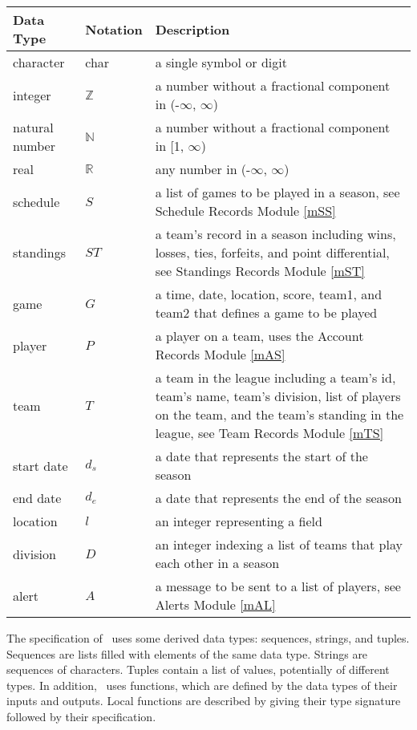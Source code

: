 \documentclass[12pt, titlepage]{article}
\begin{document}
\begin{center}
\renewcommand{\arraystretch}{1.2}
\noindent 
\begin{tabular}{l l p{7.5cm}} 
\toprule 
\textbf{Data Type} & \textbf{Notation} & \textbf{Description}\\ 
\midrule
character & char & a single symbol or digit\\
integer & $\mathbb{Z}$ & a number without a fractional component in (-$\infty$, $\infty$) \\
natural number & $\mathbb{N}$ & a number without a fractional component in [1, $\infty$) \\
real & $\mathbb{R}$ & any number in (-$\infty$, $\infty$)\\
schedule & $S$ & a list of games to be played in a season, see Schedule
Records Module \ref{mSS}\\
standings & $ST$ & a team's record in a season including wins, losses,
ties, forfeits, and point differential, see Standings
Records Module \ref{mST}\\
game & $G$ & a time, date, location, score, team1, and team2 that defines a game to
be played\\
player & $P$ & a player on a team, uses the Account Records Module
\ref{mAS}\\
team & $T$ & a team in the league including a team's id, team's name, team's division,
list of players on the team, and the team's standing in the league,
see Team Records Module \ref{mTS}\\
start date & $d_s$ & a date that represents the start of the season\\
end date & $d_e$ & a date that represents the end of the season\\
location & $l$ & an integer representing a field\\
division & $D$ & an integer indexing a list of teams that play each other in a
season\\
alert & $A$ & a message to be sent to a list of players, see Alerts Module
\ref{mAL}\\

\bottomrule
\end{tabular} 
\end{center}

\noindent
The specification of \progname \ uses some derived data types: sequences, strings, and
tuples. Sequences are lists filled with elements of the same data type. Strings
are sequences of characters. Tuples contain a list of values, potentially of
different types. In addition, \progname \ uses functions, which
are defined by the data types of their inputs and outputs. Local functions are
described by giving their type signature followed by their specification.
\end{document}
